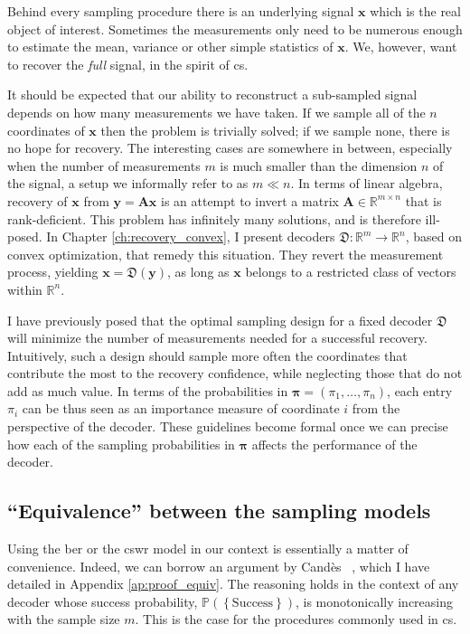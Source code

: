 Behind every sampling procedure there is an underlying signal $\mathbf{x}$ which is the real object of interest. Sometimes the measurements only need to be numerous enough to estimate the mean, variance or other simple statistics of $\mathbf{x}$. We, however, want to recover the \emph{full} signal, in the spirit of \acrfull{cs}.

It should be expected that our ability to reconstruct a sub-sampled signal depends on how many measurements we have taken. If we sample all of the $n$ coordinates of $\mathbf{x}$ then the problem is trivially solved; if we sample none, there is no hope for recovery. The interesting cases are somewhere in between, especially when the number of measurements $m$ is much smaller than the dimension $n$ of the signal, a setup we informally refer to as $m \ll n$. In terms of linear algebra, recovery of $\mathbf{x}$ from $\mathbf{y} = \mathbf{Ax}$ is an attempt to invert a matrix $\mathbf{A} \in \mathbb{R}^{m \times n}$ that is rank-deficient. This problem has infinitely many solutions, and is therefore ill-posed. In Chapter \ref{ch:recovery_convex}, I present decoders $\mathfrak{D} : \mathbb{R}^{m} \to \mathbb{R}^{n}$, based on convex optimization, that remedy this situation. They revert the measurement process, yielding $\mathbf{x} = \mathfrak{D}(\mathbf{y})$, as long as $\mathbf{x}$ belongs to a restricted class of vectors within $\mathbb{R}^{n}$.

I have previously posed that the optimal sampling design for a fixed decoder $\mathfrak{D}$ will minimize the number of measurements needed for a successful recovery. Intuitively, such a design should sample more often the coordinates that contribute the most to the recovery confidence, while neglecting those that do not add as much value. In terms of the probabilities in $\bm{\pi} = (\pi_1, \dots, \pi_n)$, each entry $\pi_i$ can be thus seen as an importance measure of coordinate $i$ from the perspective of the decoder. These guidelines become formal once we can precise how each of the sampling probabilities in $\bm{\pi}$ affects the performance of the decoder.


\subsection{``Equivalence'' between the sampling models}\label{sec:samp_equiv}

Using the \acrshort{ber} or the \acrshort{cswr} model in our context is essentially a matter of convenience. Indeed, we can borrow an argument by Cand\`es \etal~\cite[Appendix]{candes2011a}, which I have detailed in Appendix \ref{ap:proof_equiv}. The reasoning holds in the context of any decoder whose success probability, $\mathbb{P} \left ( \left \{ \text{Success} \right \}\right )$, is monotonically increasing with the sample size $m$. This is the case for the procedures commonly used in \acrlong{cs}.

